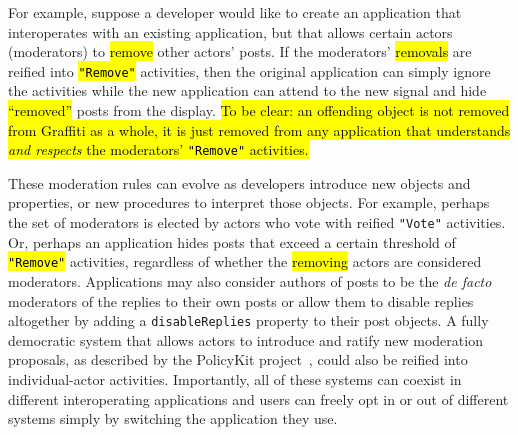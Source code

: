 
For example, suppose a developer would like to create an application
that interoperates with an existing application,
but that allows certain actors (moderators) to \hl{remove} other actors' posts.
If the moderators' \hl{removals} are reified into \hl{\texttt{"Remove"}} activities,
then the original application can simply ignore the activities
while the new application can attend to the new signal and hide \hl{``removed''} posts from the display.
\hl{%
To be clear: an offending object is not removed from Graffiti as a whole,
it is just removed from any application that understands \emph{and respects}
the moderators' \texttt{"Remove"} activities.
}%

These moderation rules can evolve as developers
introduce new objects and properties,
or new procedures to interpret those objects.
For example,
perhaps the set of moderators is elected by actors who vote with reified \texttt{"Vote"} activities.
Or, perhaps an application hides posts that exceed a certain threshold of \hl{\texttt{"Remove"}} activities,
regardless of whether the \hl{removing} actors are considered moderators.
Applications may also consider authors of posts to be the \emph{de facto} moderators of the replies to their
own posts or allow them to disable replies altogether by adding a \texttt{disableReplies}
property to their post objects.
A fully democratic system that allows actors to introduce and ratify new moderation proposals,
as described by the PolicyKit project~\cite{policykit}, could also be reified into
individual-actor activities.
Importantly, all of these systems can coexist in different interoperating
applications and users can freely opt in or out of different systems simply by switching
the application they use.





